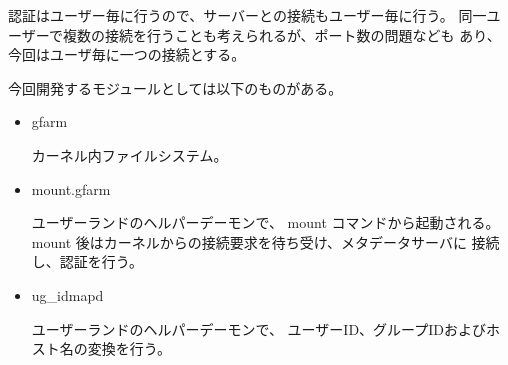認証はユーザー毎に行うので、サーバーとの接続もユーザー毎に行う。
同一ユーザーで複数の接続を行うことも考えられるが、ポート数の問題なども
あり、今回はユーザ毎に一つの接続とする。

今回開発するモジュールとしては以下のものがある。
\begin{itemize}
\item	gfarm \par
	カーネル内ファイルシステム。
	
\item	mount.gfarm \par
	ユーザーランドのヘルパーデーモンで、
	mount コマンドから起動される。
	mount 後はカーネルからの接続要求を待ち受け、メタデータサーバに
	接続し、認証を行う。
\item	ug_idmapd \par
	ユーザーランドのヘルパーデーモンで、
	ユーザーID、グループIDおよびホスト名の変換を行う。
\end{itemize}

